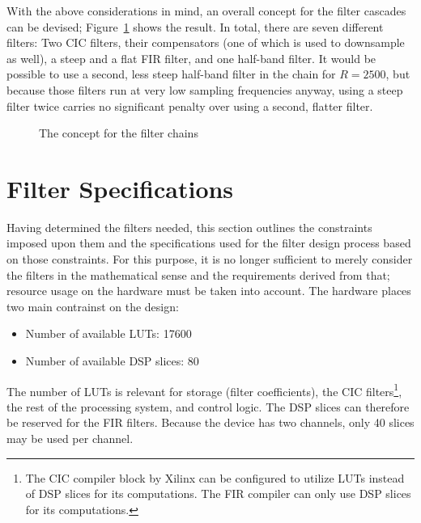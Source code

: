 With  the above  considerations in  mind, an  overall concept  for the  filter
cascades  can  be  devised; Figure~\ref{fig:fdesign:chain_concept}  shows  the
result. In total,  there are seven  different filters: Two CIC  filters, their
compensators (one of which is used to  downsample as well), a steep and a flat
FIR filter,  and one half-band filter. It  would be possible to  use a second,
less  steep half-band  filter in  the chain  for $R=2500$,  but because  those
filters run  at very  low sampling  frequencies anyway,  using a  steep filter
twice carries no significant penalty over using a second, flatter filter.

\begin{figure}
    \centering
    
    \caption[Filter Chain Concept]{The concept for the filter chains}
    \label{fig:fdesign:chain_concept}
\end{figure}

%
%
\section{Filter Specifications} %
\label{sec:fdesign:filter_specifications}

Having determined  the filters needed,  this section outlines  the constraints
imposed upon  them and the specifications  used for the  filter design process
based on those  constraints.  For this purpose, it is  no longer sufficient to
merely consider  the filters  in the mathematical  sense and  the requirements
derived from that; resource usage on  the hardware must be taken into account.
The hardware places two main contrainst on the design:
\begin{itemize}\tightlist
    \item
        Number of available LUTs: \num{17600}
    \item
        Number of available DSP slices: \num{80}
\end{itemize}
The number  of LUTs  is relevant  for storage  (filter coefficients),  the CIC
filters\footnote{%
    The CIC compiler block by Xilinx can be configured to utilize LUTs instead
    of DSP  slices for  its computations. The  FIR compiler  can only  use DSP
    slices for its computations.%
},
the  rest of  the processing  system, and  control logic. The  DSP slices  can
therefore  be  reserved  for  the  FIR filters. Because  the  device  has  two
channels, only 40 slices may be used per channel.

